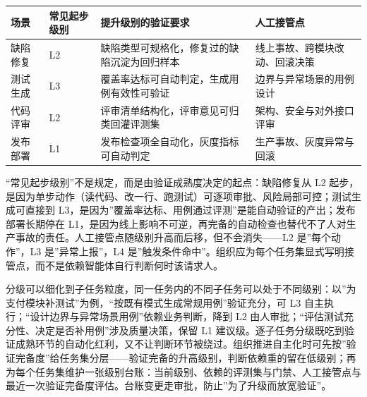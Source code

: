 \documentclass[
]{ctexbook}
\newcounter{none}
\begin{document}
{\def\LTcaptype{none} %
\begin{longtable}[]{@{}
  >{\raggedright\arraybackslash}p{}
  >{\raggedright\arraybackslash}p{}
  >{\raggedright\arraybackslash}p{}
  >{\raggedright\arraybackslash}p{}@{}}
\toprule\noalign{}
\begin{minipage}[b]{\linewidth}\raggedright
场景
\end{minipage} & \begin{minipage}[b]{\linewidth}\raggedright
常见起步级别
\end{minipage} & \begin{minipage}[b]{\linewidth}\raggedright
提升级别的验证要求
\end{minipage} & \begin{minipage}[b]{\linewidth}\raggedright
人工接管点
\end{minipage} \\
\midrule\noalign{}
\endhead
\bottomrule\noalign{}
\endlastfoot
缺陷修复 & L2 & 缺陷类型可规格化，修复过的缺陷沉淀为回归样本 &
线上事故、跨模块改动、回滚决策 \\
测试生成 & L3 & 覆盖率达标可自动判定，生成用例有效性可验证 &
边界与异常场景的用例设计 \\
代码评审 & L2 & 评审清单结构化，评审意见可归类回灌评测集 &
架构、安全与对外接口评审 \\
发布部署 & L1 & 发布检查项全自动化，灰度指标可自动判定 &
生产事故、灰度异常与回滚 \\
\end{longtable}
}

``常见起步级别''不是规定，而是由验证成熟度决定的起点：缺陷修复从 L2
起步，是因为单步动作（读代码、改一行、跑测试）可逐项审批、风险局部可控；测试生成可直接到
L3，是因为''覆盖率达标、用例通过评测''是能自动验证的产出；发布部署长期停在
L1，是因为线上影响不可逆，再完备的自动检查也替代不了人对生产事故的责任。人工接管点随级别升高而后移，但不会消失------L2
是''每个动作''，L3 是''异常上报''，L4
是''触发条件命中''。组织应为每个任务集显式写明接管点，而不是依赖智能体自行判断何时该请求人。

分级可以细化到子任务粒度，同一任务内的不同子任务可以处于不同级别：以''为支付模块补测试''为例，``按既有模式生成常规用例''验证充分，可
L3 自主执行；``设计边界与异常场景用例''依赖业务判断，降到 L2
由人审批；``评估测试充分性、决定是否补用例''涉及质量决策，保留 L1
建议级。逐子任务分级既吃到验证成熟环节的自动化红利，又不让判断环节被绕过。组织推进自主化时可先按''验证完备度''给任务集分层------验证完备的升高级别，判断依赖重的留在低级别；再为每个任务集维护一张级别台账：当前级别、依赖的评测集与门禁、人工接管点与最近一次验证完备度评估。台账变更走审批，防止''为了升级而放宽验证''。
\end{document}
